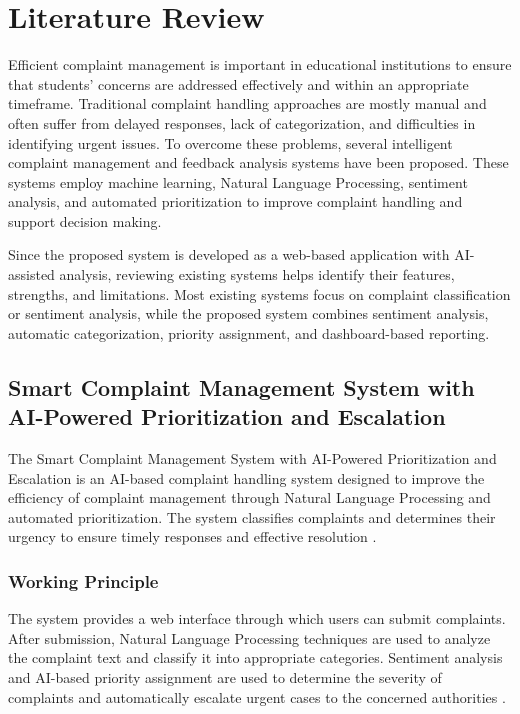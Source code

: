 \documentclass[12pt,a4paper]{report}
\begin{document}
\chapter{Literature Review}

Efficient complaint management is important in educational institutions to ensure that students' concerns are addressed effectively and within an appropriate timeframe. Traditional complaint handling approaches are mostly manual and often suffer from delayed responses, lack of categorization, and difficulties in identifying urgent issues. To overcome these problems, several intelligent complaint management and feedback analysis systems have been proposed. These systems employ machine learning, Natural Language Processing, sentiment analysis, and automated prioritization to improve complaint handling and support decision making.

Since the proposed system is developed as a web-based application with AI-assisted analysis, reviewing existing systems helps identify their features, strengths, and limitations. Most existing systems focus on complaint classification or sentiment analysis, while the proposed system combines sentiment analysis, automatic categorization, priority assignment, and dashboard-based reporting.

\section{Smart Complaint Management System with AI-Powered Prioritization and Escalation}
The Smart Complaint Management System with AI-Powered Prioritization and Escalation is an AI-based complaint handling system designed to improve the efficiency of complaint management through Natural Language Processing and automated prioritization. The system classifies complaints and determines their urgency to ensure timely responses and effective resolution \cite{deo2025}.

\subsection{Working Principle}
The system provides a web interface through which users can submit complaints. After submission, Natural Language Processing techniques are used to analyze the complaint text and classify it into appropriate categories. Sentiment analysis and AI-based priority assignment are used to determine the severity of complaints and automatically escalate urgent cases to the concerned authorities \cite{deo2025}.
\end{document}
